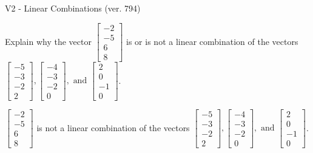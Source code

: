 \begin{exercise}
  \begin{exerciseTitle}V2 - Linear Combinations (ver. 794)\end{exerciseTitle}
  \begin{exerciseStatement}
    Explain why the vector \(\left[\begin{array}{c}
-2 \\
-5 \\
6 \\
8
\end{array}\right]\)  is or is not a linear 
	combination of the vectors \(\left[\begin{array}{c}
-5 \\
-3 \\
-2 \\
2
\end{array}\right] , \left[\begin{array}{c}
-4 \\
-3 \\
-2 \\
0
\end{array}\right] , \text{ and } \left[\begin{array}{c}
2 \\
0 \\
-1 \\
0
\end{array}\right]\).
	


  \end{exerciseStatement}
  \begin{exerciseAnswer}
   \(\left[\begin{array}{c}
-2 \\
-5 \\
6 \\
8
\end{array}\right]\) 
  	 is not  
	a linear combination of the vectors \(\left[\begin{array}{c}
-5 \\
-3 \\
-2 \\
2
\end{array}\right] , \left[\begin{array}{c}
-4 \\
-3 \\
-2 \\
0
\end{array}\right] , \text{ and } \left[\begin{array}{c}
2 \\
0 \\
-1 \\
0
\end{array}\right]\).

	
  


  \end{exerciseAnswer}
\end{exercise}
